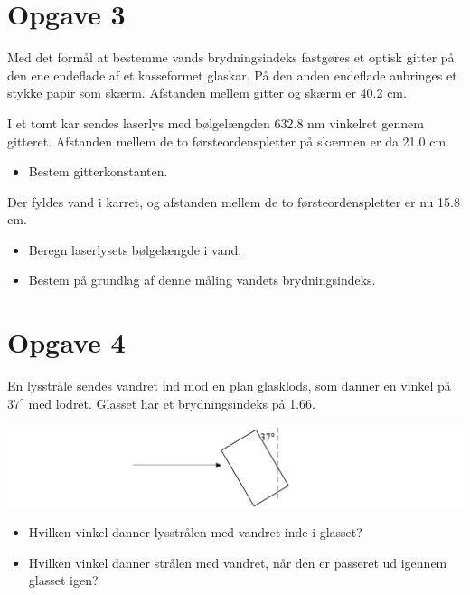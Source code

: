 \documentclass[a4paper, 12pt]{article}
\begin{document}
\section*{Opgave 3}
\label{sec:orgde8a4f8}

Med det formål at bestemme vands brydningsindeks fastgøres et optisk gitter på den ene endeflade af et kasseformet glaskar. På den anden endeflade anbringes et stykke papir som skærm. Afstanden mellem gitter og skærm er 40.2 cm.

I et tomt kar sendes laserlys med bølgelængden 632.8 nm vinkelret gennem gitteret. Afstanden mellem de to førsteordenspletter på skærmen er da 21.0 cm.

\begin{itemize}
\item Bestem gitterkonstanten.
\end{itemize}

Der fyldes vand i karret, og afstanden mellem de to førsteordenspletter er nu 15.8 cm.

\begin{itemize}
\item Beregn laserlysets bølgelængde i vand.

\item Bestem på grundlag af denne måling vandets brydningsindeks.
\end{itemize}

\section*{Opgave 4}
\label{sec:org958d502}

En lysstråle sendes vandret ind mod en plan glasklods, som danner en vinkel på \(37^\circ\) med lodret. Glasset har et brydningsindeks på 1.66.

\begin{center}
\includegraphics[width=.9\linewidth]{./img/glasklods.png}
\end{center}

\begin{itemize}
\item Hvilken vinkel danner lysstrålen med vandret inde i glasset?

\item Hvilken vinkel danner strålen med vandret, når den er passeret ud igennem glasset igen?
\end{itemize}
\end{document}
